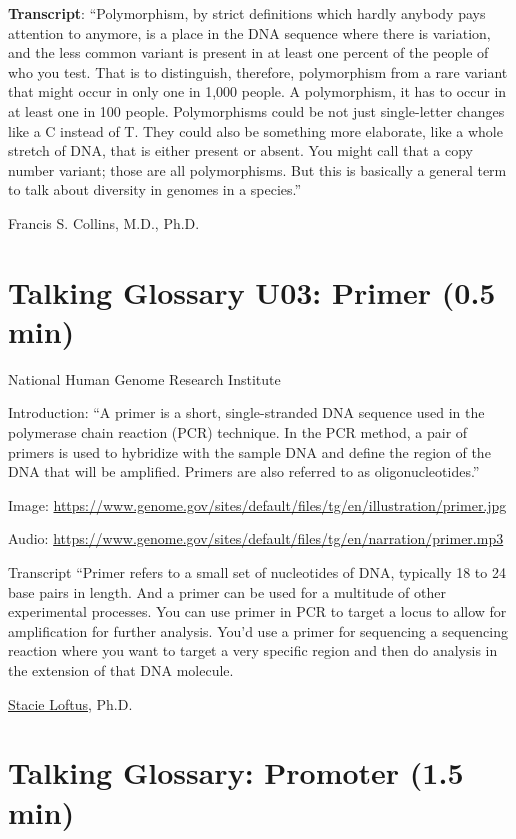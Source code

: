 \documentclass[
]{book}
\begin{document}
\textbf{Transcript}: ``Polymorphism, by strict definitions which hardly anybody pays attention to anymore, is a place in the DNA sequence where there is variation, and the less common variant is present in at least one percent of the people of who you test. That is to distinguish, therefore, polymorphism from a rare variant that might occur in only one in 1,000 people. A polymorphism, it has to occur in at least one in 100 people. Polymorphisms could be not just single-letter changes like a C instead of T. They could also be something more elaborate, like a whole stretch of DNA, that is either present or absent. You might call that a copy number variant; those are all polymorphisms. But this is basically a general term to talk about diversity in genomes in a species.''

Francis S. Collins, M.D., Ph.D.

\hypertarget{talking-glossary-u03-primer-0.5-min}{%
\section{Talking Glossary U03: Primer (0.5 min)}\label{talking-glossary-u03-primer-0.5-min}}

National Human Genome Research Institute

Introduction: ``A primer is a short, single-stranded DNA sequence used in the polymerase chain reaction (PCR) technique. In the PCR method, a pair of primers is used to hybridize with the sample DNA and define the region of the DNA that will be amplified. Primers are also referred to as oligonucleotides.''

Image: \url{https://www.genome.gov/sites/default/files/tg/en/illustration/primer.jpg}

Audio: \url{https://www.genome.gov/sites/default/files/tg/en/narration/primer.mp3}

Transcript
``Primer refers to a small set of nucleotides of DNA, typically 18 to 24 base pairs in length. And a primer can be used for a multitude of other experimental processes. You can use primer in PCR to target a locus to allow for amplification for further analysis. You'd use a primer for sequencing a sequencing reaction where you want to target a very specific region and then do analysis in the extension of that DNA molecule.

\href{https://www.genome.gov/staff/Stacie-Loftus-PhD}{Stacie Loftus}, Ph.D.

\hypertarget{talking-glossary-promoter-1.5-min}{%
\section{Talking Glossary: Promoter (1.5 min)}\label{talking-glossary-promoter-1.5-min}}
\end{document}
